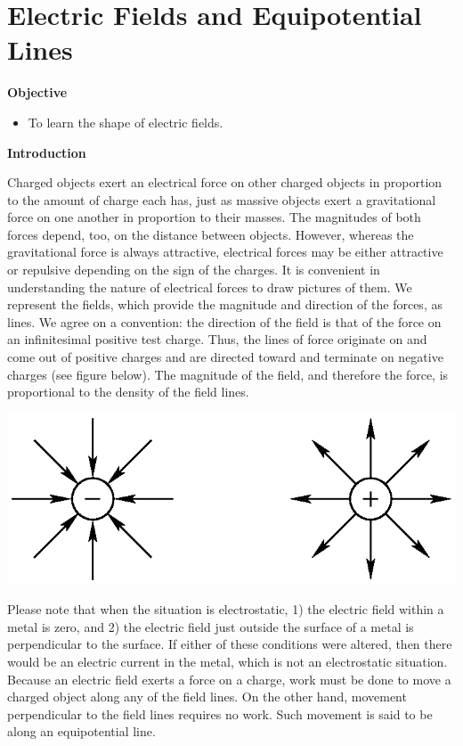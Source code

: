 
\section{Electric Fields and Equipotential Lines}

\makelabheader %

\textbf{Objective}

\begin{itemize}
\item To learn the shape of electric fields.
\end{itemize}
\textbf{Introduction}

Charged objects exert an electrical force on other charged objects
in proportion to the amount of charge each has, just as massive objects
exert a gravitational force on one another in proportion to their
masses. The magnitudes of both forces depend, too, on the distance
between objects. However, whereas the gravitational force is always
attractive, electrical forces may be either attractive or repulsive
depending on the sign of the charges. It is convenient in understanding
the nature of electrical forces to draw pictures of them. We represent
the fields, which provide the magnitude and direction of the forces,
as lines. We agree on a convention: the direction of the field is
that of the force on an infinitesimal positive test charge. Thus,
the lines of force originate on and come out of positive charges and
are directed toward and terminate on negative charges (see figure
below). The magnitude of the field, and therefore the force, is proportional
to the density of the field lines.

\vspace{0.3cm}
{\centering \includegraphics{electric_fields_and_equipotential_lines/ef_equipot_lines_fig_1.eps} \par}
\vspace{0.3cm}

Please note that when the situation is electrostatic, 1) the electric
field within a metal is zero, and 2) the electric field just outside
the surface of a metal is perpendicular to the surface. If either
of these conditions were altered, then there would be an electric
current in the metal, which is not an electrostatic situation. Because
an electric field exerts a force on a charge, work must be done to move a
charged object along any of the field lines. On the other hand, movement
perpendicular to the field lines requires no work. Such movement is
said to be along an equipotential line.

